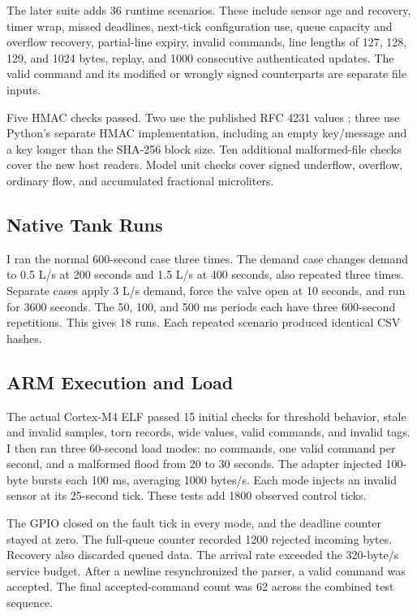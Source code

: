 \documentclass[conference]{IEEEtran}
\begin{document}
The later suite adds 36 runtime scenarios. These include sensor age and recovery, timer wrap, missed deadlines, next-tick configuration use, queue capacity and overflow recovery, partial-line expiry, invalid commands, line lengths of 127, 128, 129, and 1024 bytes, replay, and 1000 consecutive authenticated updates. The valid command and its modified or wrongly signed counterparts are separate file inputs.

Five HMAC checks passed. Two use the published RFC 4231 values \cite{rfc}; three use Python's separate HMAC implementation, including an empty key/message and a key longer than the SHA-256 block size. Ten additional malformed-file checks cover the new host readers. Model unit checks cover signed underflow, overflow, ordinary flow, and accumulated fractional microliters.

\subsection{Native Tank Runs}
I ran the normal 600-second case three times. The demand case changes demand to 0.5 L/s at 200 seconds and 1.5 L/s at 400 seconds, also repeated three times. Separate cases apply 3 L/s demand, force the valve open at 10 seconds, and run for 3600 seconds. The 50, 100, and 500 ms periods each have three 600-second repetitions. This gives 18 runs. Each repeated scenario produced identical CSV hashes.

\subsection{ARM Execution and Load}
The actual Cortex-M4 ELF passed 15 initial checks for threshold behavior, stale and invalid samples, torn records, wide values, valid commands, and invalid tags. I then ran three 60-second load modes: no commands, one valid command per second, and a malformed flood from 20 to 30 seconds. The adapter injected 100-byte bursts each 100 ms, averaging 1000 bytes/s. Each mode injects an invalid sensor at its 25-second tick. These tests add 1800 observed control ticks.

The GPIO closed on the fault tick in every mode, and the deadline counter stayed at zero. The full-queue counter recorded 1200 rejected incoming bytes. Recovery also discarded queued data. The arrival rate exceeded the 320-byte/s service budget. After a newline resynchronized the parser, a valid command was accepted. The final accepted-command count was 62 across the combined test sequence.
\end{document}
